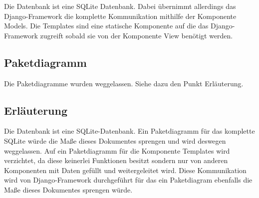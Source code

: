 Die Datenbank ist eine SQLite Datenbank. Dabei übernimmt allerdings das
Django-Framework die komplette Kommunikation mithilfe der Komponente Models. 
Die Templates sind eine statische Komponente auf die das Django-Framework
zugreift sobald sie von der Komponente View benötigt werden. 

\subsection{Paketdiagramm}
Die Paketdiagramme wurden weggelassen. Siehe dazu den Punkt Erläuterung.

\subsection{Erl\"auterung}
Die Datenbank ist eine SQLite-Datenbank. Ein Paketdiagramm für das komplette
SQLite würde die Maße dieses Dokumentes sprengen und wird deswegen weggelassen.
Auf ein Paketdiagramm für die Komponente Templates wird verzichtet, da diese
keinerlei Funktionen besitzt sondern nur von anderen Komponenten mit Daten
gefüllt und weitergeleitet wird. Diese Kommunikation wird von Django-Framework
durchgeführt für das ein Paketdiagram ebenfalls die Maße dieses Dokumentes
sprengen würde.
